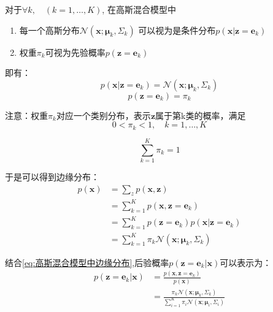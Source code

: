 \documentclass[withoutpreface,bwprint]{NoteBook}
\begin{document}
对于$\forall k, \quad (k=1,\dots,K) $,
在高斯混合模型中
\begin{enumerate}
    \item 每一个高斯分布$\mathcal{N}(\mathbf{x};\bm{\mu}_k,\Sigma_k)$
可以视为是条件分布$p(\mathbf{x}|\mathbf{z} = \mathbf{e}_k)$
    \item 权重$\pi_k$可视为先验概率$ p(\mathbf{z} = \mathbf{e}_k)$
\end{enumerate}
即有：
\begin{equation}
    \label{eq:高斯混合模型中条件分布}
    p(\mathbf{x}|\mathbf{z} = \mathbf{e}_k) = \mathcal{N}(\mathbf{x};\bm{\mu}_k,\Sigma_k)
\end{equation}
\begin{equation}
    \label{eq:高斯混合模型中先验概率}
    p(\mathbf{z} = \mathbf{e}_k) = \pi_k
\end{equation}

注意：权重$\pi_k$对应一个类别分布，表示$\mathbf{z}$属于第k类的概率，满足
\begin{equation}
    \label{eq:高斯混合模型中权重所满足的条件1}
    0<\pi_k<1, \quad k = 1,\dots,K
\end{equation}

\begin{equation}
    \label{eq:高斯混合模型中权重所满足的条件2}
    \sum_{k=1}^K \pi_k = 1
\end{equation}

于是可以得到边缘分布：
\begin{align}
    \label{eq:高斯混合模型中边缘分布}
    p(\mathbf{x}) 
    &= \sum_{z} p(\mathbf{x},\mathbf{z} ) \nonumber \\
    &= \sum_{k=1}^{K} p(\mathbf{x},\mathbf{z} = \mathbf{e}_k) \nonumber \\
    &= \sum_{k=1}^K p(\mathbf{z}=\mathbf{e}_k) p(\mathbf{x}|\mathbf{z} = \mathbf{e}_k) \nonumber \\
    &= \sum_{k=1}^K \pi_k \mathcal{N}(\mathbf{x};\bm{\mu}_k,\Sigma_k)
\end{align}

结合\cref{eq:高斯混合模型中边缘分布},后验概率$p(\mathbf{z}=\mathbf{e}_k|\mathbf{x})$可以表示为：
\begin{align}
    \label{eq:高斯混合模型中后验概率}
    p(\mathbf{z}=\mathbf{e}_k|\mathbf{x}) 
    &= \frac{p(\mathbf{x},\mathbf{z}=\mathbf{e}_k)}{p(\mathbf{x})} \nonumber \\
    &= \frac{\pi_k \mathcal{N}(\mathbf{x};\bm{\mu}_k,\Sigma_k)}{\sum_{i=1}^{K} \pi_i \mathcal{N}(\mathbf{x};\bm{\mu}_i,\Sigma_i)}
\end{align}
\end{document}
